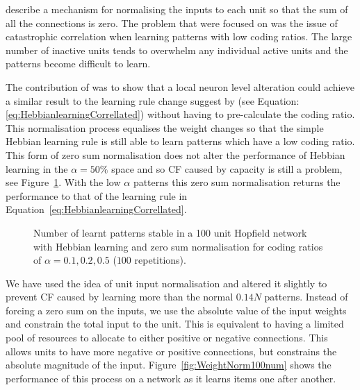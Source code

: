 \citet{Chechik2001} describe a mechanism for normalising the inputs to each unit so that the sum of all the connections is zero.  The problem that \citet{Chechik2001} were focused on was the issue of catastrophic correlation when learning patterns with low coding ratios.  The large number of inactive units tends to overwhelm any individual active units and the patterns become difficult to learn.  

The contribution of \citet{Chechik2001} was to show that a local neuron level alteration could achieve a similar result to the learning rule change suggest by \citet{Amit1987b}(see Equation:\eqref{eq:HebbianlearningCorrellated}) without having to pre-calculate the coding ratio.  This normalisation process equalises the weight changes so that the simple Hebbian learning rule is still able to learn patterns which have a low coding ratio.  This form of zero sum normalisation does not alter the performance of Hebbian learning in the $\alpha =50\%$ space and so CF caused by capacity is still a problem, see Figure~\ref{fig:WeightNormZM100num}.  With the low $\alpha$ patterns this zero sum normalisation returns the performance to that of the learning rule in Equation~\eqref{eq:HebbianlearningCorrellated}.

\begin{figure}[tbp]
\small
\center
	
	\caption{Number of learnt patterns stable in a 100 unit Hopfield network  with Hebbian learning and zero sum normalisation for coding ratios of $\alpha =0.1 , 0.2, 0.5$ ($100$ repetitions).}
	\label{fig:WeightNormZM100num}
\end{figure}

We have used the idea of unit input normalisation and altered it slightly to prevent CF caused by learning more than the normal $0.14N$ patterns.  Instead of forcing a zero sum on the inputs, we use the absolute value of the input weights and constrain the total input to the unit.  This is equivalent to having a limited pool of resources to allocate to either positive or negative connections.  This allows units to have more negative or positive connections, but constrains the absolute magnitude of the input.  Figure~\ref{fig:WeightNorm100num} shows the performance of this  process on a network as it learns items one after another.  

